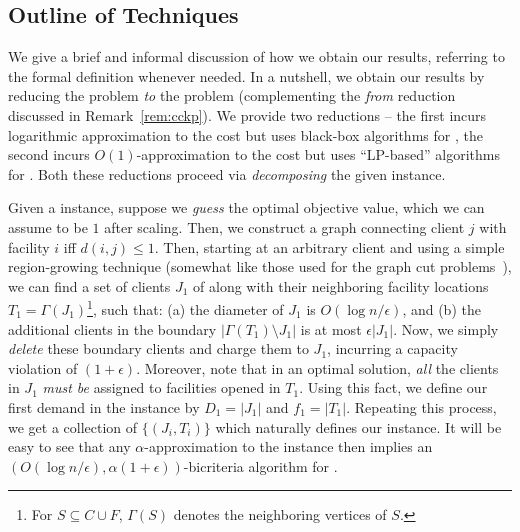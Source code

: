\subsection{Outline of Techniques} \label{sec:overview}
We give a brief and informal discussion of how we obtain our results, referring to the formal definition whenever needed.
In a nutshell, we obtain our results by reducing the \mckc problem {\em to} the \cckp problem (complementing the {\em from} reduction  discussed in Remark~\ref{rem:cckp}).
We provide two reductions -- the first incurs logarithmic approximation to the cost but uses black-box algorithms for \cckp, the second incurs $O(1)$-approximation to the cost but uses ``LP-based'' algorithms for \cckp.
Both these reductions proceed via {\em decomposing} the given \mckc instance. %

\medskip {}
Given a \cckp instance, suppose we \emph{guess} the optimal objective value, which we can assume to be $1$ after scaling. Then, we construct a graph connecting client $j$ with facility $i$ iff $d(i,j) \leq 1$.
Then, starting at an arbitrary client and using a simple region-growing technique (somewhat like those used for the graph cut problems~\cite{LeightonR99,GargVY96}), we can find a set of clients $J_1$ of along with their neighboring facility locations $T_1 = \Gamma(J_1)$\footnote{For $S \subseteq C \cup F$, $\Gamma(S)$ denotes the neighboring vertices  of $S$.}, such that: (a) the diameter of $J_1$ is $O(\log n/\epsilon)$, and (b) the additional clients in the boundary $|\Gamma(T_1) \setminus J_1|$ is at most $\epsilon |J_1|$. Now, we simply \emph{delete} these boundary clients and charge them to $J_1$, incurring a capacity violation of $(1+\epsilon)$. Moreover, note that in an optimal solution, \emph{all} the clients in $J_1$ \emph{must be} assigned to facilities opened in $T_1$. Using this fact, we define our first demand in the \cckp instance by $D_1 = |J_1|$ and $f_1 = |T_1|$. Repeating this process, we get a collection of $\{(J_i,T_i)\}$ which naturally defines our \cckp instance. It will be easy to see that any $\alpha$-approximation to the \cckp instance then implies an $(O(\log n/\epsilon),  \alpha(1+\epsilon))$-bicriteria algorithm for \mckc.

